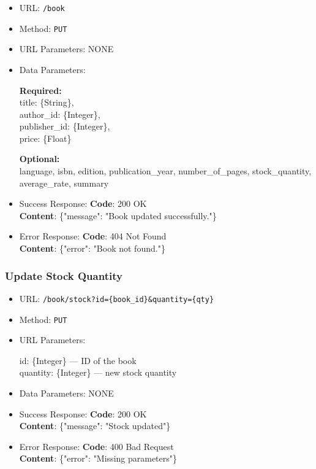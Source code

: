 \begin{itemize}
    \item URL: \texttt{/book}
    \item Method: \texttt{PUT}
    \item URL Parameters: NONE
    \item Data Parameters:

    \textbf{Required:} \\
    title: \{String\}, \\
    author\_id: \{Integer\}, \\
    publisher\_id: \{Integer\}, \\
    price: \{Float\}

    \textbf{Optional:} \\
    language, isbn, edition, publication\_year, number\_of\_pages, stock\_quantity, average\_rate, summary


    \item Success Response: \newline
    \textbf{Code}: 200 OK \\
    \textbf{Content}: \{"message": "Book updated successfully."\}

    \item Error Response: \newline
    \textbf{Code}: 404 Not Found \\
    \textbf{Content}: \{"error": "Book not found."\}
\end{itemize}

\subsubsection*{Update Stock Quantity}

\begin{itemize}
    \item URL: \texttt{/book/stock?id=\{book\_id\}\&quantity=\{qty\}}
    \item Method: \texttt{PUT}
    \item URL Parameters:

    id: \{Integer\} — ID of the book \\
    quantity: \{Integer\} — new stock quantity

    \item Data Parameters: NONE

    \item Success Response: \newline
    \textbf{Code}: 200 OK \\
    \textbf{Content}: \{"message": "Stock updated"\}

    \item Error Response: \newline
    \textbf{Code}: 400 Bad Request \\
    \textbf{Content}: \{"error": "Missing parameters"\}
\end{itemize}

